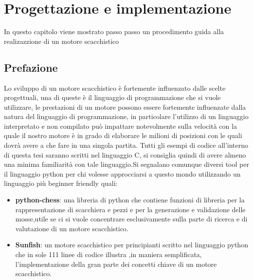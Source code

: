 \chapter{Progettazione e implementazione} %
%

\begin{citazione}
In questo capitolo viene mostrato passo passo un procedimento guida alla realizazzione di un motore scacchistico
\end{citazione}

\newpage
\section{Prefazione} %
Lo sviluppo di un motore scacchistico è fortemente influenzato dalle scelte progettuali,
una di queste è il linguaggio di programmazione che si vuole utilizzare,
le prestazioni di un motore possono essere fortemente influenzate dalla natura del linguaggio di 
programmazione, in particolare l'utilizzo di un linguaggio interpretato e non compilato può impattare
notevolmente sulla velocità con la quale il nostro motore è in grado di elaborare le milioni di 
posizioni con le quali dovrà avere a che fare in una singola partita.
Tutti gli esempi di codice all'interno di questa tesi saranno scritti nel linguaggio C, si consiglia
quindi di avere almeno una minima familiarità con tale linguaggio.Si segnalano comunque diversi 
tool  per il linguaggio python per chi volesse approcciarsi a questo mondo utilizzando un
linguaggio più beginner friendly  quali:
\begin{itemize}
	\item \textbf{python-chess}: una libreria di python che contiene funzioni di libreria per la rappresentazione 
          di scacchiera e pezzi e per la generazione e validazione delle mosse,utile se ci si vuole concentrare
          esclusivamente sulla parte di ricerca e di valutazione  di un motore scacchistico.
	\item \textbf{Sunfish}: un motore scacchistico per principianti scritto nel linguaggio python che
           in sole 111 linee di codice illustra ,in maniera semplificata, l'implementazione della 
           gran parte dei concetti  chiave di un motore scacchistico.

\end{itemize}


